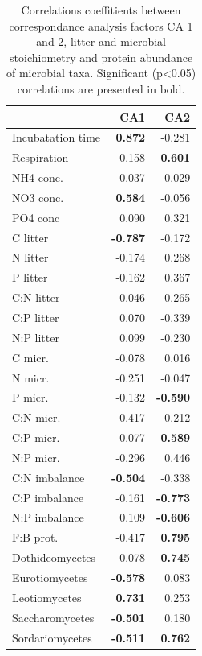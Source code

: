 \documentclass[10pt]{article}
\begin{document}
\begin{flushleft}
\begin{table}[h!]
\centering
\caption{Correlations coeffitients between correspondance analysis factors CA 1 and 2, litter and microbial stoichiometry and protein abundance of microbial taxa. Significant (p\textless 0.05) correlations are presented in bold.} 
\label{catab}
{\small
\begin{tabular}{lrr}
  \hline
 & CA1 & CA2 \\ 
  \hline
Incubatation time & \textbf{ 0.872 } & -0.281 \\ 
  Respiration & -0.158 & \textbf{ 0.601 } \\ 
  NH4 conc. & 0.037 & 0.029 \\ 
  NO3 conc. & \textbf{ 0.584 } & -0.056 \\ 
  PO4 conc & 0.090 & 0.321 \\ 
  C litter & \textbf{ -0.787 } & -0.172 \\ 
  N litter & -0.174 & 0.268 \\ 
  P litter & -0.162 & 0.367 \\ 
  C:N litter & -0.046 & -0.265 \\ 
  C:P litter & 0.070 & -0.339 \\ 
  N:P litter & 0.099 & -0.230 \\ 
  C micr. & -0.078 & 0.016 \\ 
  N micr. & -0.251 & -0.047 \\ 
  P micr. & -0.132 & \textbf{ -0.590 } \\ 
  C:N micr. & 0.417 & 0.212 \\ 
  C:P micr. & 0.077 & \textbf{ 0.589 } \\ 
  N:P micr. & -0.296 & 0.446 \\ 
  C:N imbalance & \textbf{ -0.504 } & -0.338 \\ 
  C:P imbalance & -0.161 & \textbf{ -0.773 } \\ 
  N:P imbalance & 0.109 & \textbf{ -0.606 } \\ 
  F:B prot. & -0.417 & \textbf{ 0.795 } \\ 
  Dothideomycetes & -0.078 & \textbf{ 0.745 } \\ 
  Eurotiomycetes & \textbf{ -0.578 } & 0.083 \\ 
  Leotiomycetes & \textbf{ 0.731 } & 0.253 \\ 
  Saccharomycetes & \textbf{ -0.501 } & 0.180 \\ 
  Sordariomycetes & \textbf{ -0.511 } & \textbf{ 0.762 } \\ 

\end{tabular}}
\end{table}
\end{flushleft}
\end{document}
